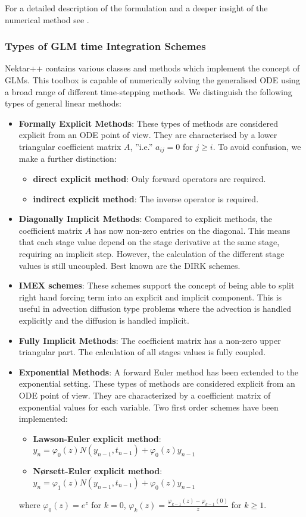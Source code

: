 For a detailed description of the formulation and a deeper insight of the
numerical method see \cite{Vostime}.

\subsubsection{Types of GLM time Integration Schemes}
Nektar++ contains various classes and methods which implement the
concept of GLMs. This toolbox is capable of numerically solving the
generalised ODE using a broad range of different time-stepping
methods. We distinguish the following types of general linear methods:
\begin{itemize}
\item \textbf{Formally Explicit Methods}: These types of methods are
  considered explicit from an ODE point of view. They are
  characterised by a lower triangular coefficient matrix $A$, ''i.e.''
  $a_{ij} = 0$ for $j\geq i$. To avoid confusion, we make a further
  distinction:
  \begin{itemize}
    \item \textbf{direct explicit method}: Only forward operators are
      required.
    \item \textbf{indirect explicit method}: The inverse operator is
      required.
  \end{itemize}
  \item \textbf{Diagonally Implicit Methods}: Compared to explicit
    methods, the coefficient matrix $A$ has now non-zero entries on
    the diagonal.  This means that each stage value depend on the
    stage derivative at the same stage, requiring an implicit
    step. However, the calculation of the different stage values is
    still uncoupled. Best known are the DIRK schemes.
  \item \textbf{IMEX schemes}: These schemes support the concept of
    being able to split right hand forcing term into an explicit and
    implicit component. This is useful in advection diffusion type
    problems where the advection is handled explicitly and the
    diffusion is handled implicit.
  \item \textbf{Fully Implicit Methods}: The coefficient matrix has a
    non-zero upper triangular part. The calculation of all stages
    values is fully coupled.
  \item \textbf{Exponential Methods}: A forward Euler method has been
    extended to the exponential setting. These types of methods are
    considered explicit from an ODE point of view. They are
    characterized by a coefficient matrix of exponential values for
    each variable. Two first order schemes have been implemented:
  \begin{itemize}
    \item \textbf{Lawson-Euler explicit method}: $y_n =
      \varphi_0(z)N(y_{n-1},t_{n-1}) + \varphi_0(z)y_{n-1}$
    \item \textbf{N{\o}rsett-Euler explicit method}: $y_n =
      \varphi_1(z)N(y_{n-1},t_{n-1}) + \varphi_0(z)y_{n-1}$
  \end{itemize}
where $\varphi_0(z) = e^{z}$ for $k = 0$, $\varphi_{k}(z) =
\frac{\varphi_{k-1}(z) - \varphi_{k-1}(0)}{z}$ for $k \geq 1$.
\end{itemize}

